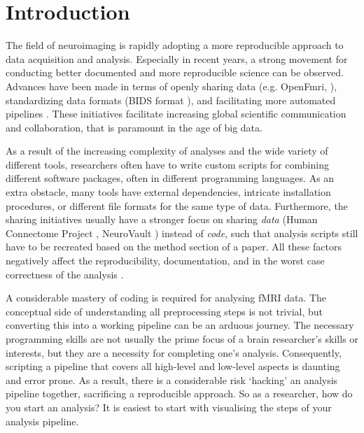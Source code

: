 \section{Introduction}
The field of neuroimaging is rapidly adopting a more reproducible approach to data acquisition and analysis. Especially in recent years, a strong movement for conducting better documented and more reproducible science can be observed. Advances have been made in terms of openly sharing data (e.g. OpenFmri, \cite{Poldrack2013}), standardizing data formats (BIDS format \cite{Gorgolewski2016}), and facilitating more automated pipelines \cite{Fischl2004,Gorgolewski2011,Jenkinson2012}. These initiatives facilitate increasing global scientific communication and collaboration, that is paramount in the age of big data.

As a result of the increasing complexity of analyses and the wide variety of different tools, researchers often have to write custom scripts for combining different software packages, often in different programming languages. As an extra obstacle, many tools have external dependencies, intricate installation procedures, or different file formats for the same type of data. Furthermore, the sharing initiatives usually have a stronger focus on sharing \emph{data} (Human Connectome Project \cite{Elam2015}, NeuroVault \cite{Gorgolewski2015}) instead of \emph{code}, such that analysis scripts still have to be recreated based on the method section of a paper. All these factors negatively affect the reproducibility, documentation, and in the worst case correctness of the analysis \cite{Nosek2015}.

A considerable mastery of coding is required for analysing fMRI data. The conceptual side of understanding all preprocessing steps is not trivial, but converting this into a working pipeline can be an arduous journey. The necessary programming skills are not usually the prime focus of a brain researcher's skills or interests, but they are a necessity for completing one's analysis. Consequently, scripting a pipeline that covers all high-level and low-level aspects is daunting and error prone. As a result, there is a considerable risk  `hacking' an analysis pipeline together, sacrificing a reproducible approach. So as a researcher, how do you start an analysis? It is easiest to start with visualising the steps of your analysis pipeline.  


